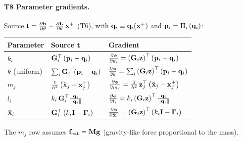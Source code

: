 \paragraph{T8 Parameter gradients.}\mbox{}
\newline Source $\mathbf{t} = \frac{\partial \mathbf{b}}{\partial \theta} - \frac{\partial \mathbf{L}}{\partial \theta}\,\mathbf{x}^+$ (T6), with $\mathbf{q}_i \equiv \mathbf{q}_i(\mathbf{x}^+)$ and $\mathbf{p}_i = \Pi_i\left(\mathbf{q}_i\right)$:
\begin{center}
\renewcommand{\arraystretch}{1.7}
\begin{tabular}{lll}
\textbf{Parameter} & \textbf{Source} $\mathbf{t}$ & \textbf{Gradient} \\ \hline
$k_i$        & $\mathbf{G}_i^\top\left(\mathbf{p}_i - \mathbf{q}_i\right)$ & $\frac{\partial \phi}{\partial k_i} = \left(\mathbf{G}_i\mathbf{z}\right)^\top\left(\mathbf{p}_i - \mathbf{q}_i\right)$ \\
$k$ (uniform) & $\sum_i\mathbf{G}_i^\top\left(\mathbf{p}_i - \mathbf{q}_i\right)$ & $\frac{\partial \phi}{\partial k} = \sum_i\left(\mathbf{G}_i\mathbf{z}\right)^\top\left(\mathbf{p}_i - \mathbf{q}_i\right)$ \\
$m_j$        & $\tfrac{1}{h^2}\left(\tilde{\mathbf{x}}_j - \mathbf{x}_j^+\right)$ & $\frac{\partial \phi}{\partial m_j} = \tfrac{1}{h^2}\,\mathbf{z}_j^\top\left(\tilde{\mathbf{x}}_j - \mathbf{x}_j^+\right)$ \\
$l_i$        & $k_i\,\mathbf{G}_i^\top\tfrac{\mathbf{q}_i}{\left\|\mathbf{q}_i\right\|}$ & $\frac{\partial \phi}{\partial l_i} = k_i\left(\mathbf{G}_i\mathbf{z}\right)^\top\tfrac{\mathbf{q}_i}{\left\|\mathbf{q}_i\right\|}$ \\
$\bar{\mathbf{x}}_i$   & $\mathbf{G}_i^\top\left(k_i\mathbf{I} - \boldsymbol{\Gamma}_i\right)$ & $\frac{\partial \phi}{\partial \bar{\mathbf{x}}_i} = \left(\mathbf{G}_i\mathbf{z}\right)^\top\left(k_i\mathbf{I} - \boldsymbol{\Gamma}_i\right)$ \\
\end{tabular}
\end{center}
\noindent The $m_j$ row assumes $\mathbf{f}_{\text{ext}} = \mathbf{M}\mathbf{g}$ (gravity-like force proportional to the mass).
